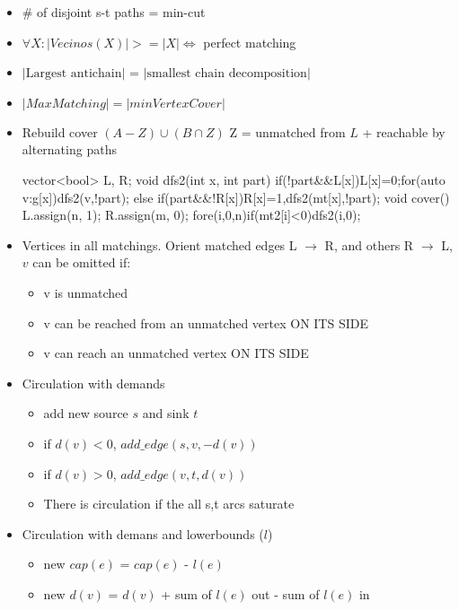 \begin{itemize}
  \item \# of disjoint s-t paths = min-cut
  \item $\forall X: |Vecinos(X)| >= |X| \iff$ perfect matching
  \item $|\text{Largest antichain}|$ = $|\text{smallest chain decomposition}|$
  \item $|Max Matching| = |min Vertex Cover|$
  \item Rebuild cover $(A-Z)\cup(B\cap Z)$ Z = unmatched from $L$ + reachable by alternating paths
  \begin{code}
  vector<bool> L, R;
  void dfs2(int x, int part) {
    if(!part&&L[x]){L[x]=0;for(auto v:g[x])dfs2(v,!part);}
    else if(part&&!R[x])R[x]=1,dfs2(mt[x],!part);
  }
  void cover() {L.assign(n, 1); R.assign(m, 0);
    fore(i,0,n)if(mt2[i]<0)dfs2(i,0);
  }\end{code}
  \item Vertices in all matchings. Orient matched edges L $\to$ R, and others R $\to$ L, $v$ can be omitted if:
    \begin{itemize}
      \item v is unmatched
      \item v can be reached from an unmatched vertex ON ITS SIDE
      \item v can reach an unmatched vertex ON ITS SIDE
    \end{itemize}
  \item Circulation with demands
  \begin{itemize}
    \item add new source $s$ and sink $t$
    \item if $d(v) < 0$, $add\_edge(s, v, -d(v))$
    \item if $d(v) > 0$, $add\_edge(v, t, d(v))$
    \item There is circulation if the all s,t arcs saturate
  \end{itemize}
  \item Circulation with demans and lowerbounds ($l$)
  \begin{itemize}
    \item new $cap(e)$ = $cap(e)$ - $l(e)$
    \item new $d(v)$ = $d(v)$ + sum of $l(e)$ out - sum of $l(e)$ in
  \end{itemize}
\end{itemize}